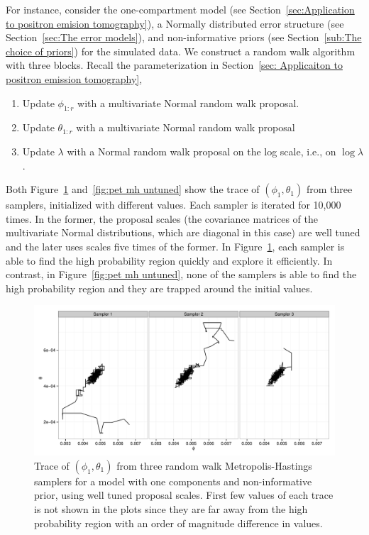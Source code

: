 For instance, consider the one-compartment \pet model (see
Section~\ref{sec:Application to positron emision tomography}), a Normally
distributed error structure (see Section~\ref{sec:The error models}), and
non-informative priors (see Section~\ref{sub:The choice of priors}) for the
simulated data. We construct a random walk algorithm with three blocks. Recall
the parameterization in Section~\ref{sec: Applicaiton to positron emission
  tomography},
\begin{enumerate}
  \item Update $\phi_{1:r}$ with a multivariate Normal random walk proposal.
  \item Update $\theta_{1:r}$ with a multivariate Normal random walk proposal
  \item Update $\lambda$ with a Normal random walk proposal on the log scale,
    i.e., on $\log\lambda$.
\end{enumerate}
Both Figure~\ref{fig:pet mh tuned} and~\ref{fig:pet mh untuned} show the trace
of $(\phi_1, \theta_1)$ from three samplers, initialized with different
values. Each sampler is iterated for 10,000 times. In the former, the proposal
scales (the covariance matrices of the multivariate Normal distributions,
which are diagonal in this case) are well tuned and the later uses scales five
times of the former. In Figure~\ref{fig:pet mh tuned}, each sampler is able to
find the high probability region quickly and explore it efficiently. In
contrast, in Figure~\ref{fig:pet mh untuned}, none of the samplers is able to
find the high probability region and they are trapped around the initial
values.

\begin{figure}
  \includegraphics[width=\linewidth]{fig/PET_MH_Path.pdf}
  \caption{Trace of $(\phi_1,\theta_1)$ from three random walk
    Metropolis-Hastings samplers for a \pet model with one components and
    non-informative prior, using well tuned proposal scales. First few values
    of each trace is not shown in the plots since they are far away from the
    high probability region with an order of magnitude difference in values.}
  \label{fig:pet mh tuned}
\end{figure}

